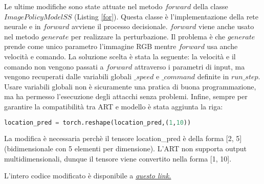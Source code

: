 Le ultime modifiche sono state attuate nel metodo $forward$ della classe $ImagePolicyModelSS$ (Listing \ref{for}). Questa classe è l'implementazione della rete neurale e in $forward$ avviene il processo decisionale.
$forward$ viene anche usato nel metodo $generate$ per realizzare la perturbazione. Il problema è che $generate$ prende come unico parametro l'immagine RGB mentre $forward$ usa anche velocità e comando.
La soluzione scelta è stata la seguente: la velocità e il comando non vengono passati a $forward$ attraverso i  parametri di input, ma vengono recuperati  dalle variabili globali $\_speed$ e $\_command$ definite in $run\_step$. Usare variabili globali
non è sicuramente una pratica di buona programmazione, ma ha permesso l'esecuzione degli attacchi senza problemi. Infine, sempre per garantire la compatibilità tra ART  e modello è stata aggiunta la riga:
\begin{lstlisting}[language=Python]
    location_pred = torch.reshape(location_pred,(1,10))
\end{lstlisting}
La modifica è necessaria perchè il tensore location\_pred è della forma [2, 5] (bidimensionale con 5 elementi per dimensione). L'ART non supporta output multidimensionali, dunque il tensore viene convertito nella forma [1, 10].

L'intero codice modificato è disponibile a \href{https://github.com/piazzesiNiccolo/myLbc}{\emph{questo link.}}




